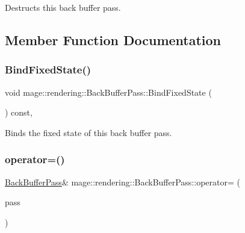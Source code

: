 Destructs this back buffer pass. 

\subsection{Member Function Documentation}
\mbox{\label{classmage_1_1rendering_1_1_back_buffer_pass_a45aafe0681a6e0598d088dbf3954cfb7}} 
\subsubsection{\texorpdfstring{Bind\+Fixed\+State()}{BindFixedState()}}
{\footnotesize\ttfamily void mage\+::rendering\+::\+Back\+Buffer\+Pass\+::\+Bind\+Fixed\+State (\begin{DoxyParamCaption}{ }\end{DoxyParamCaption}) const\hspace{0.3cm}{\ttfamily [private]}, {\ttfamily [noexcept]}}

Binds the fixed state of this back buffer pass. \mbox{\label{classmage_1_1rendering_1_1_back_buffer_pass_acad71e5633ba37b1069c5a2ef9e6f704}} 
\subsubsection{\texorpdfstring{operator=()}{operator=()}\hspace{0.1cm}{\footnotesize\ttfamily [1/2]}}
{\footnotesize\ttfamily \mbox{\hyperlink{classmage_1_1rendering_1_1_back_buffer_pass}{Back\+Buffer\+Pass}}\& mage\+::rendering\+::\+Back\+Buffer\+Pass\+::operator= (\begin{DoxyParamCaption}\item[{const \mbox{\hyperlink{classmage_1_1rendering_1_1_back_buffer_pass}{Back\+Buffer\+Pass}} \&}]{pass }\end{DoxyParamCaption})\hspace{0.3cm}{\ttfamily [delete]}}

